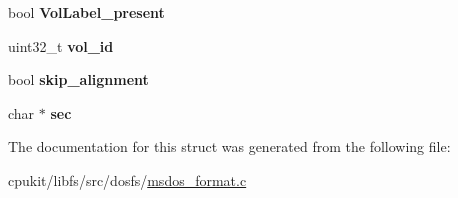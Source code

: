 \begin{DoxyCompactItemize}
bool {\bfseries Vol\+Label\+\_\+present}
\item 
\mbox{\label{structmsdos__format__param__t_a46ffc5b88e5f86c67119fb40bd94a6b4}} 
uint32\+\_\+t {\bfseries vol\+\_\+id}
\item 
\mbox{\label{structmsdos__format__param__t_a5602a85547633dde75a5ff00e677f96c}} 
bool {\bfseries skip\+\_\+alignment}
\item 
\mbox{\label{structmsdos__format__param__t_a88ac4e019eead34979d033f0a21a0345}} 
char $\ast$ {\bfseries sec}
\end{DoxyCompactItemize}


The documentation for this struct was generated from the following file\+:\begin{DoxyCompactItemize}
\item 
cpukit/libfs/src/dosfs/\mbox{\hyperlink{msdos__format_8c}{msdos\+\_\+format.\+c}}\end{DoxyCompactItemize}
